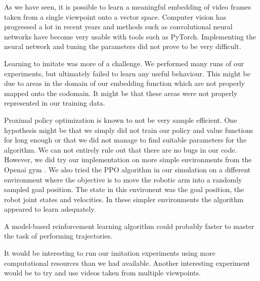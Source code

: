 
As we have seen, it is possible to learn a meaningful embedding of video frames taken from a single viewpoint onto a vector space. Computer vision has progressed a lot in recent years and methods such as convolutional neural networks have become very usable with tools such as PyTorch. Implementing the neural network and tuning the parameters did not prove to be very difficult.

Learning to imitate was more of a challenge. We performed many runs of our experiments, but ultimately failed to learn any useful behaviour. This might be due to areas in the domain of our embedding function which are not properly mapped onto the codomain. It might be that these areas were not properly represented in our training data.

Proximal policy optimization is known to not be very sample efficient. One hypothesis might be that we simply did not train our policy and value functions for long enough or that we did not manage to find suitable parameters for the algorithm. We can not entirely rule out that there are no bugs in our code. However, we did try our implementation on more simple environments from the Openai gym \citep{gym}. We also tried the PPO algorithm in our simulation on a different environment where the objective is to move the robotic arm into a randomly sampled goal position. The state in this environent was the goal position, the robot joint states and velocities. In these simpler environments the algorithm appeared to learn adequately.

A model-based reinforcement learning algorithm could probably faster to master the task of performing trajectories.

It would be interesting to run our imitation experiments using more computational resources than we had available. Another interesting experiment would be to try and use videos taken from multiple viewpoints.


